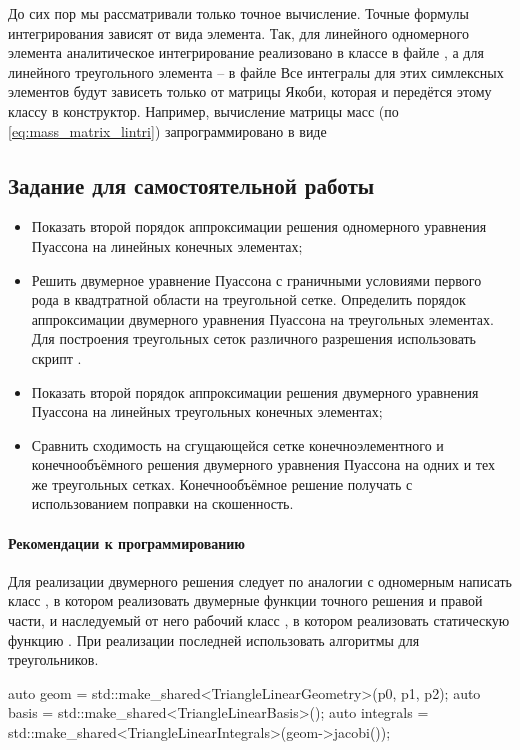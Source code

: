 До сих пор мы рассматривали только точное вычисление.
Точные формулы интегрирования зависят
от вида элемента. Так, для линейного одномерного элемента
аналитическое интегрирование реализовано в классе
 в файле ,
а для линейного треугольного элемента -- 
 в файле 
Все интегралы для этих симлексных элементов будут зависеть только от матрицы Якоби, которая и передётся этому классу в конструктор.
Например, вычисление матрицы масс (по \cref{eq:mass_matrix_lintri}) запрограммировано в виде

\subsection{Задание для самостоятельной работы}
\label{sec:fem_programming_problem}
\begin{itemize}
\item
Показать второй порядок аппроксимации решения одномерного уравнения Пуассона
на линейных конечных элементах;
\item
Решить двумерное уравнение Пуассона с граничными условиями первого рода в квадтратной области на треугольной сетке.
Определить порядок аппроксимации двумерного уравнения Пуассона на треугольных элементах.
Для построения треугольных сеток различного разрешения использовать
скрипт .
\item
Показать второй порядок аппроксимации решения двумерного уравнения Пуассона
на линейных треугольных конечных элементах;
\item
Сравнить сходимость на сгущающейся сетке конечноэлементного и конечнообъёмного решения
двумерного уравнения Пуассона на одних и тех же треугольных сетках.
Конечнообъёмное решение получать с использованием поправки на скошенность.
\end{itemize}

\paragraph{Рекомендации к программированию}
Для реализации двумерного решения
следует по аналогии с одномерным написать класс
,
в котором реализовать двумерные функции точного решения и правой части,
и наследуемый от него рабочий класс 
,
в котором реализовать статическую функцию .
При реализации последней
использовать
алгоритмы для треугольников.
\begin{cppcode}
auto geom = std::make_shared<TriangleLinearGeometry>(p0, p1, p2);
auto basis = std::make_shared<TriangleLinearBasis>();
auto integrals = std::make_shared<TriangleLinearIntegrals>(geom->jacobi({}));
\end{cppcode}
